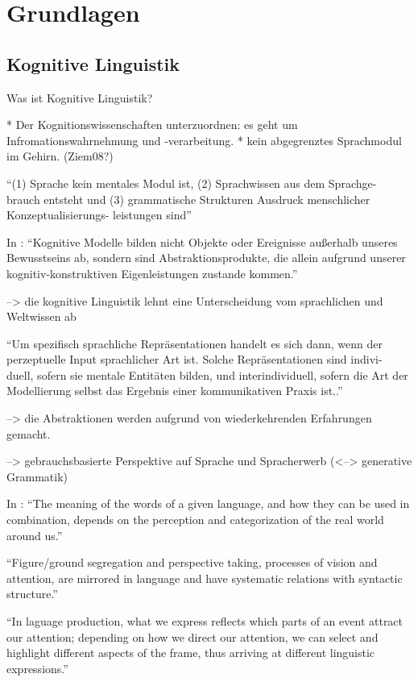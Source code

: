 \section{Grundlagen}

\subsection{Kognitive Linguistik}
Was ist Kognitive Linguistik?

* Der Kognitionswissenschaften unterzuordnen: es geht um Infromationswahrnehmung und -verarbeitung.
* kein abgegrenztes Sprachmodul im Gehirn. (Ziem08?)

\cite{Ziem13} ``(1) Sprache kein mentales Modul ist, (2) Sprachwissen aus dem Sprachge-
brauch entsteht und (3) grammatische Strukturen Ausdruck menschlicher Konzeptualisierungs-
leistungen sind''

In \cite{Ziem08}: ``Kognitive Modelle bilden nicht Objekte oder Ereignisse außerhalb unseres
Bewusstseins ab, sondern sind Abstraktionsprodukte, die allein aufgrund
unserer kognitiv-konstruktiven Eigenleistungen zustande kommen.''

--> die kognitive Linguistik lehnt eine Unterscheidung vom sprachlichen und Weltwissen ab

``Um spezifisch sprachliche Repräsentationen handelt es sich dann, wenn der
perzeptuelle Input sprachlicher Art ist. Solche Repräsentationen sind indivi-
duell, sofern sie mentale Entitäten bilden, und interindividuell, sofern die Art
der Modellierung selbst das Ergebnis einer kommunikativen Praxis ist..''

--> die Abstraktionen werden aufgrund von wiederkehrenden Erfahrungen gemacht.

--> gebrauchsbasierte Perspektive auf Sprache und Spracherwerb (<--> generative Grammatik)


In \cite{Ellis08}: ``The meaning of the words of a given language, and how they can be used in combination, depends on the perception and categorization of the real world around us.''

``Figure/ground segregation and perspective taking, processes of vision and attention, are mirrored in language and have systematic relations with syntactic structure.''

``In laguage production, what we express reflects which parts of an event attract our attention;
depending on how we direct our attention, we can select and highlight different aspects of the frame, thus arriving at different linguistic expressions.''

